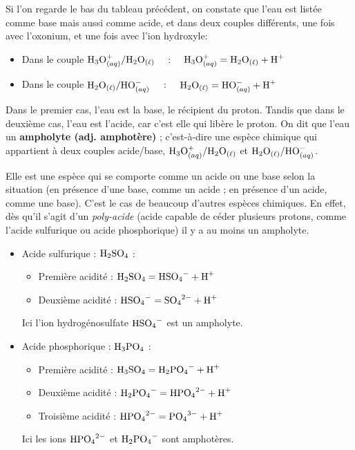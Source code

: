 \documentclass[11pt,a4paper]{article}
\begin{document}
Si l'on regarde le bas du tableau précédent, on constate que l'eau est listée comme base mais aussi comme acide, et dans deux couples différents, une fois avec l'oxonium, et une fois avec l'ion hydroxyle: 

\begin{itemize}
    \item Dans le couple $ \oxo/\eau \quad$ : $\quad \oxo = \eau + \ce{H+}$
    \item Dans le couple $ \eau / \OH \quad $ : $\quad \eau = \OH + \ce{H+}$
\end{itemize}

Dans le premier cas, l’eau est la base, le récipient du proton.  Tandis que dans le deuxième cas, l’eau est l’acide, car c’est elle qui libère le proton.  On dit que l’eau un \textbf{ampholyte (adj. amphotère)} ;  c'est-à-dire une espèce chimique qui appartient à deux couples acide/base, $ \oxo/\eau$ et $ \eau / \OH$.  

Elle est une espèce qui se comporte comme un acide ou une base selon la situation (en présence d’une base, comme un acide ; en présence d’un acide, comme une base). C'est le cas de beaucoup d'autres espèces chimiques. En effet, dès qu'il s'agit d'un \emph{poly-acide} (acide capable de céder plusieurs protons, comme l'acide sulfurique ou acide phosphorique) il y a au moins un ampholyte. 

\begin{eg} %
\begin{itemize}
    \item Acide sulfurique : $\ce{H2SO4}$ : 
    \begin{itemize}
        \item Première acidité : $\ce{H2SO4} = \ce{HSO4-} + \ce{H+}$
        \item Deuxième acidité : $\ce{HSO4-} = \ce{SO4^2-} + \ce{H+}$
    \end{itemize}
    Ici l'ion hydrogénosulfate $\ce{HSO4-}$ est un ampholyte. 
    \item Acide phosphorique : $\ce{H3PO4}$ : 
    \begin{itemize}
        \item Première acidité : $\ce{H3SO4} = \ce{H2PO4-} + \ce{H+}$
        \item Deuxième acidité : $\ce{H2PO4-} = \ce{HPO4^2-} + \ce{H+}$
        \item Troisième acidité : $\ce{HPO4^2-} = \ce{PO4^3-} + \ce{H+}$
    \end{itemize}    
    Ici les ions $\ce{HPO4^2-}$ et $\ce{H2PO4-}$ sont amphotères. 
\end{itemize}
\end{eg}
\end{document}
